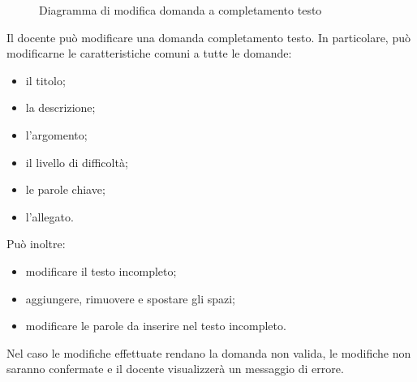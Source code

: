 \documentclass[a4paper, titlepage]{article}
\begin{document}
\newpage
{}
\begin{figure}[H]
	\centering
	\noindent{}
	\caption{Diagramma di modifica domanda a completamento testo}
\end{figure}
Il docente può modificare una domanda completamento testo. In particolare, può modificarne le caratteristiche comuni a tutte le domande:
\begin{itemize}
	\item il titolo;
	\item la descrizione;
	\item l’argomento;
	\item il livello di difficoltà;
	\item le parole chiave;
	\item l’allegato.
\end{itemize}
Può inoltre:
\begin{itemize}
	\item modificare il testo incompleto;
	\item aggiungere, rimuovere e spostare gli spazi;
	\item modificare le parole da inserire nel testo incompleto. 
\end{itemize}
Nel caso le modifiche effettuate rendano la domanda non valida, le modifiche non saranno confermate e il docente visualizzerà un messaggio di errore.
\end{document}
